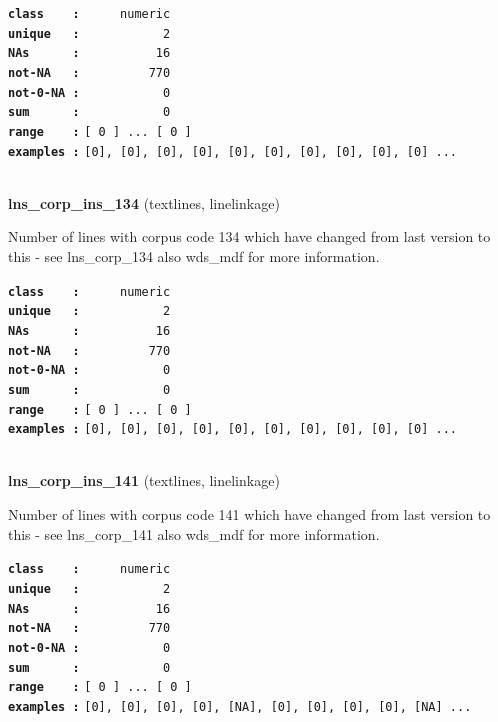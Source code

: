 \documentclass[]{article}
\begin{document}
\textbf{\texttt{class\ \ \ \ :}} \texttt{~~~~~numeric}\\
\textbf{\texttt{unique\ \ \ :}} \texttt{~~~~~~~~~~~2}\\
\textbf{\texttt{NAs\ \ \ \ \ \ :}} \texttt{~~~~~~~~~~16}\\
\textbf{\texttt{not-NA\ \ \ :}} \texttt{~~~~~~~~~770}\\
\textbf{\texttt{not-0-NA\ :}} \texttt{~~~~~~~~~~~0}\\
\textbf{\texttt{sum\ \ \ \ \ \ :}} \texttt{~~~~~~~~~~~0}\\
\textbf{\texttt{range\ \ \ \ :}}
\texttt{{[}\ 0\ {]}\ ...\ {[}\ 0\ {]}}\\
\textbf{\texttt{examples\ :}}
\texttt{{[}0{]},\ {[}0{]},\ {[}0{]},\ {[}0{]},\ {[}0{]},\ {[}0{]},\ {[}0{]},\ {[}0{]},\ {[}0{]},\ {[}0{]}\ ...}\\

~

\textbf{lns\_corp\_ins\_134} (textlines, linelinkage)

Number of lines with corpus code 134 which have changed from last
version to this - see lns\_corp\_134 also wds\_mdf for more information.

\textbf{\texttt{class\ \ \ \ :}} \texttt{~~~~~numeric}\\
\textbf{\texttt{unique\ \ \ :}} \texttt{~~~~~~~~~~~2}\\
\textbf{\texttt{NAs\ \ \ \ \ \ :}} \texttt{~~~~~~~~~~16}\\
\textbf{\texttt{not-NA\ \ \ :}} \texttt{~~~~~~~~~770}\\
\textbf{\texttt{not-0-NA\ :}} \texttt{~~~~~~~~~~~0}\\
\textbf{\texttt{sum\ \ \ \ \ \ :}} \texttt{~~~~~~~~~~~0}\\
\textbf{\texttt{range\ \ \ \ :}}
\texttt{{[}\ 0\ {]}\ ...\ {[}\ 0\ {]}}\\
\textbf{\texttt{examples\ :}}
\texttt{{[}0{]},\ {[}0{]},\ {[}0{]},\ {[}0{]},\ {[}0{]},\ {[}0{]},\ {[}0{]},\ {[}0{]},\ {[}0{]},\ {[}0{]}\ ...}\\

~

\textbf{lns\_corp\_ins\_141} (textlines, linelinkage)

Number of lines with corpus code 141 which have changed from last
version to this - see lns\_corp\_141 also wds\_mdf for more information.

\textbf{\texttt{class\ \ \ \ :}} \texttt{~~~~~numeric}\\
\textbf{\texttt{unique\ \ \ :}} \texttt{~~~~~~~~~~~2}\\
\textbf{\texttt{NAs\ \ \ \ \ \ :}} \texttt{~~~~~~~~~~16}\\
\textbf{\texttt{not-NA\ \ \ :}} \texttt{~~~~~~~~~770}\\
\textbf{\texttt{not-0-NA\ :}} \texttt{~~~~~~~~~~~0}\\
\textbf{\texttt{sum\ \ \ \ \ \ :}} \texttt{~~~~~~~~~~~0}\\
\textbf{\texttt{range\ \ \ \ :}}
\texttt{{[}\ 0\ {]}\ ...\ {[}\ 0\ {]}}\\
\textbf{\texttt{examples\ :}}
\texttt{{[}0{]},\ {[}0{]},\ {[}0{]},\ {[}0{]},\ {[}NA{]},\ {[}0{]},\ {[}0{]},\ {[}0{]},\ {[}0{]},\ {[}NA{]}\ ...}\\
\end{document}
